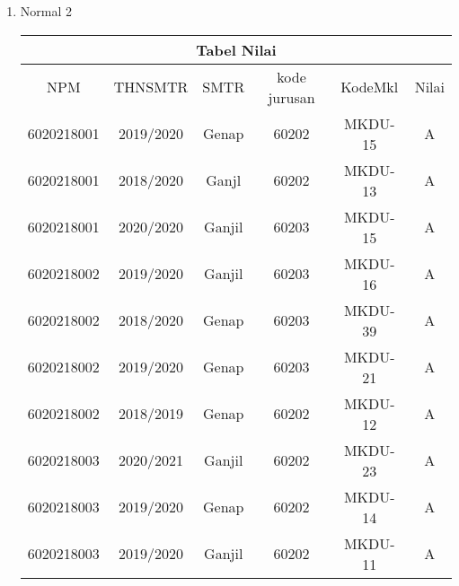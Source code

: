 \documentclass[12pt,a4paper]{article}
\begin{document}
\begin{enumerate}
\begin{enumerate}
          \item Normal 2

            \begin{adjustbox}{scale=0.5,center}
              \begin{tabular}{ |c|c|c|c|c|c| } 
                \hline
                \multicolumn{6}{|c|}{Tabel Nilai} \\ \hline
                NPM        & THNSMTR   & SMTR    & kode jurusan & KodeMkl & Nilai \\ \hline \hline
                6020218001 & 2019/2020 & Genap   & 60202        & MKDU-15 & A     \\ \hline
                6020218001 & 2018/2020 & Ganjl   & 60202        & MKDU-13 & A     \\ \hline
                6020218001 & 2020/2020 & Ganjil  & 60203        & MKDU-15 & A     \\ \hline
                6020218002 & 2019/2020 & Ganjil  & 60203        & MKDU-16 & A     \\ \hline
                6020218002 & 2018/2020 & Genap   & 60203        & MKDU-39 & A     \\ \hline
                6020218002 & 2019/2020 & Genap   & 60203        & MKDU-21 & A     \\ \hline
                6020218002 & 2018/2019 & Genap   & 60202        & MKDU-12 & A     \\ \hline
                6020218003 & 2020/2021 & Ganjil  & 60202        & MKDU-23 & A     \\ \hline
                6020218003 & 2019/2020 & Genap   & 60202        & MKDU-14 & A     \\ \hline
                6020218003 & 2019/2020 & Ganjil  & 60202        & MKDU-11 & A     \\ 
                \hline
              \end{tabular}
            \end{adjustbox}


\end{enumerate}
\end{enumerate}
\end{document}
